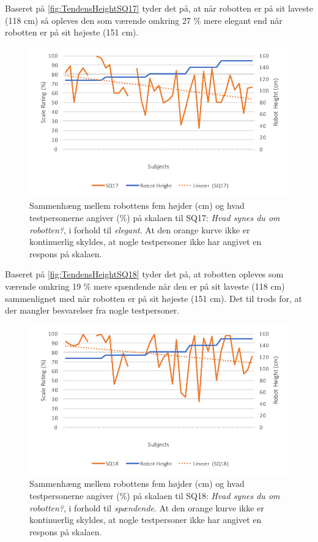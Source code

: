 \noindent
%
Baseret på \autoref{fig:TendensHeightSQ17} tyder det på, at når robotten er på sit laveste (118 cm) så opleves den som værende omkring 27 \% mere elegant end når robotten er på sit højeste (151 cm).
%
\begin{figure}[H]
\centering
\includegraphics[width=\textwidth]{Figure/DatabehandlingSkalaer/TendensHeight/HeightSQ17}
\caption{Sammenhæng mellem robottens fem højder (cm) og hvad testpersonerne angiver (\%) på skalaen til SQ17: \textit{Hvad synes du om robotten?}, i forhold til \textit{elegant}. At den orange kurve ikke er kontinuerlig skyldes, at nogle testpersoner ikke har angivet en respons på skalaen.}
\label{fig:TendensHeightSQ17}
\end{figure}
\noindent
%
Baseret på \autoref{fig:TendensHeightSQ18} tyder det på, at robotten opleves som værende omkring 19 \% mere spændende når den er på sit laveste (118 cm) sammenlignet med når robotten er på sit højeste (151 cm). Det til trods for, at der mangler besvarelser fra nogle testpersoner. 
%
\begin{figure}[H]
\centering
\includegraphics[width=\textwidth]{Figure/DatabehandlingSkalaer/TendensHeight/HeightSQ18}
\caption{Sammenhæng mellem robottens fem højder (cm) og hvad testpersonerne angiver (\%) på skalaen til SQ18: \textit{Hvad synes du om robotten?}, i forhold til \textit{spændende}. At den orange kurve ikke er kontinuerlig skyldes, at nogle testpersoner ikke har angivet en respons på skalaen.}
\label{fig:TendensHeightSQ18}
\end{figure}

